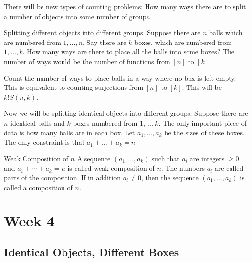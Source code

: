 \documentclass{report}
\begin{document}
There will be new types of counting problems: How many ways there are to split a number of objects into some number of groups.
\begin{examples}
    \begin{example}
        Splitting different objects into different groups. Suppose there are $n$ balls which are numbered from $1, \ldots, n$. Say there are $k$ boxes, which are numbered from $1, \ldots, k$. How many ways are there to place all the balls into some boxes? The number of ways would be the number of functions from $[n]$ to $[k]$.

        Count the number of ways to place balls in a way where no box is left empty. This is equivalent to counting surjections from $[n]$ to $[k]$. This will be $k!S(n, k)$.
    \end{example}
    \begin{example}
        Now we will be splitting identical objects into different groups. Suppose there are $n$ identical balls and $k$ boxes numbered from $1, \ldots, k$. The only important piece of data is how many balls are in each box. Let $a_{1}, \ldots, a_{k}$ be the sizes of these boxes. The only constraint is that $a_{1} + \ldots + a_{k} = n$
    \end{example}
\end{examples}

\begin{definition}{Weak Composition of $n$}
    A sequence $(a_{1}, \ldots, a_{k})$ such that $a_{i}$ are integers $\geq 0$ and $a_{1} + \cdots + a_{k} = n$ is called weak composition of $n$. The numbers $a_{i}$ are called parts of the composition. If in addition $a_{i} \neq 0$, then the sequence $(a_{1}, \ldots, a_{k})$ is called a composition of $n$.
\end{definition}

\chapter{Week 4}

\begin{topic}
    \section{Identical Objects, Different Boxes}
\end{topic}
\end{document}
